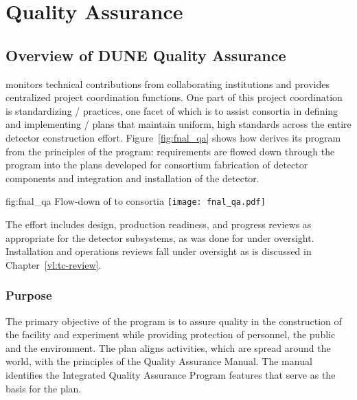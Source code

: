 \chapter{Quality Assurance}
\label{vl:tc-QA}

\section{Overview of DUNE Quality Assurance}

  monitors technical contributions from
collaborating institutions and provides centralized project
coordination functions. One part of this project coordination is
standardizing / practices, one facet
of which is to assist consortia in defining and implementing
/ plans that maintain uniform, high
standards across the entire detector construction
effort. Figure~\ref{fig:fnal_qa} shows how  
derives its  program from the principles of the \fnal {} program:
requirements are flowed down through the 
 program into the  plans developed for consortium fabrication of
detector components and integration and installation of the detector.
\begin{dunefigure}[\fnal QA]{fig:fnal_qa}
  {Flow-down of \fnal {} to consortia}
  \texttt{[image: fnal\_qa.pdf]}
\end{dunefigure}
The  effort includes design, production readiness, and
progress reviews as appropriate for the  detector
subsystems, as was done for  under 
oversight. Installation and operations reviews fall under 
oversight as is discussed in Chapter~\ref{vl:tc-review}.

\subsection{Purpose}

The primary objective of the   program is
to assure quality in the construction of the  facility and
 experiment while providing protection of
 personnel, the public and the environment. The
 plan aligns   activities, which
are spread around the world, with the principles of the \fnal Quality
Assurance Manual. The manual identifies the \fnal Integrated Quality
Assurance Program features that serve as the basis for the
  plan.

